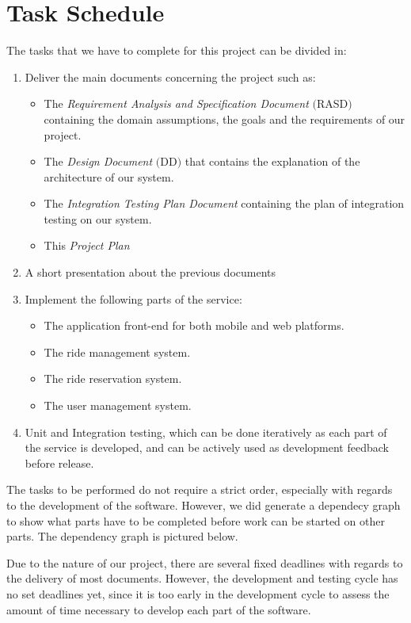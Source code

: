 \section{Task Schedule}
The tasks that we have to complete for this project can be divided in:
\begin{enumerate}
\item Deliver the main documents concerning the project such as:
	\begin{itemize}
		\item The \textit{Requirement Analysis and Specification Document} $($RASD$)$ containing the domain assumptions, the goals and the requirements of our project.
		\item The \textit{Design Document} $($DD$)$ that contains the explanation of the architecture of our system.
		\item The \textit{Integration Testing Plan Document} containing the plan of integration testing on our system.
		\item This \textit{Project Plan}
	\end{itemize}
\item A short presentation about the previous documents
\item Implement the following parts of the service:
	\begin{itemize}
		\item The application front-end for both mobile and web platforms.
		\item The ride management system.
		\item The ride reservation system.
		\item The user management system.
	\end{itemize}
\item Unit and Integration testing, which can be done iteratively as each part of the service is developed, and can be actively used as development feedback before release.
\end{enumerate}

The tasks to be performed do not require a strict order, especially with regards to the development of the software. However, we did generate a dependecy graph to show what parts have
to be completed before work can be started on other parts. The dependency graph is pictured below.





Due to the nature of our project, there are several fixed deadlines with regards to the delivery of most documents. However, the development and testing cycle has no set deadlines 
yet, since it is too early in the development cycle to assess the amount of time necessary to develop each part of the software.


